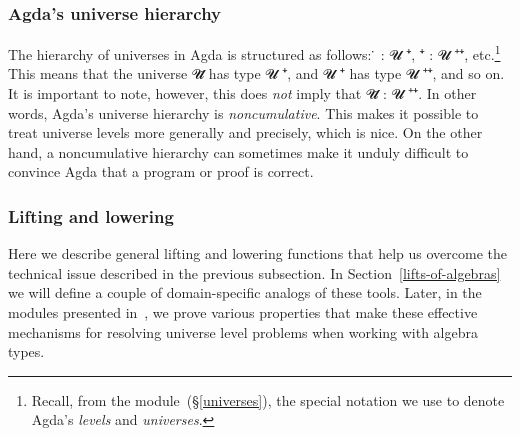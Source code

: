 \subsubsection{Agda's universe hierarchy}\label{agdas-universe-hierarchy}



The hierarchy of universes in Agda is structured as follows: \af ̇ \as : \ab 𝓤 \af ⁺\af ̇,
 \af ⁺\af ̇ \as : \ab 𝓤 \af ⁺\af ⁺\af ̇, etc.\footnote{Recall, from the  module~(\S\ref{universes}), the special notation we use to denote Agda's \textit{levels} and \textit{universes}.}
This means that the universe \ab 𝓤\af ̇ has type \ab 𝓤  \af ⁺\af ̇, and 𝓤 \af ⁺\af ̇ has type \ab 𝓤 \af ⁺\af ⁺\af ̇, and so on.  It is important to note, however, this does \emph{not} imply that \ab 𝓤\af ̇ \as : \ab 𝓤 \af ⁺\af ⁺\af ̇. In other words, Agda's universe hierarchy is \emph{noncumulative}. This makes it possible to treat universe levels more generally and precisely, which is nice. On the other hand, a noncumulative hierarchy can sometimes make it unduly difficult to convince Agda that a program or proof is correct. 

\subsubsection{Lifting and lowering}\label{lifting-and-lowering}
Here we describe general lifting and lowering functions that help us overcome the technical issue described in the previous subsection. In Section~\ref{lifts-of-algebras} we will define a couple of domain-specific analogs of these tools.  Later, in the  modules presented in~\cite{DeMeo:2021-2,DeMeo:2021-3}, we prove various properties that make these effective mechanisms for resolving universe level problems when working with algebra types.

